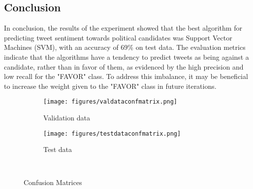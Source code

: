 \documentclass[11pt, a4paper]{article}
\begin{document}
\begin{large}
\section{Conclusion}
In conclusion, the results of the experiment showed that the best algorithm for predicting tweet sentiment towards political candidates was Support Vector Machines (SVM), with an accuracy of 69\% on test data. The evaluation metrics indicate that the algorithms have a tendency to predict tweets as being against a candidate, rather than in favor of them, as evidenced by the high precision and low recall for the "FAVOR" class. To address this imbalance, it may be beneficial to increase the weight given to the "FAVOR" class in future iterations.
\begin{figure}[H]
  \begin{subfigure}{.5\textwidth}
    \centering
    \texttt{[image: figures/valdataconfmatrix.png]}
    \caption{Validation data}
    \label{fig:sub1}
  \end{subfigure}%
  \begin{subfigure}{.5\textwidth}
    \centering
    \texttt{[image: figures/testdataconfmatrix.png]}
    \caption{Test data}
    \label{fig:sub2}
  \end{subfigure}\
  \caption{Confusion Matrices}

\end{figure}

\end{large}
\end{document}
